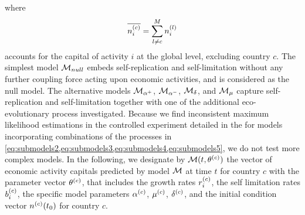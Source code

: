 where 
\begin{equation}
      \overline{n_i^{(c)} } = \sum_{l \neq c}^M n_{i}^{(l)}
\end{equation}
accounts for the capital of activity $i$ at the global level, excluding country $c$. 
% 
The simplest model $\mathcal{M}_{null}$ embeds self-replication and self-limitation without any further coupling force acting upon economic activities, and is considered as the null model.
% 
The alternative models $\mathcal{M}_{\alpha^+}$, $\mathcal{M}_{\alpha^-}$, $\mathcal{M}_\delta$, and $\mathcal{M}_\mu$ capture self-replication and self-limitation together with one of the additional eco-evolutionary process investigated.
% 
Because we find inconsistent maximum likelihood estimations in the controlled experiment detailed in the  for models incorporating combinations of the processes in \cref{eq:submodels2,eq:submodels3,eq:submodels4,eq:submodels5}, we do not test more complex models.
% 
In the following, we designate by $\mathcal{M}(t,\theta^{(c)} )$ the vector of economic activity capitals predicted by model $\mathcal{M}$ at time $t$ for country $c$ with the parameter vector $\theta^{(c)}$, that includes the growth rates $r_i^{(c)} $, the self limitation rates $b_i^{(c)}$, the specific model parameters $\alpha^{(c)}$, $\mu^{(c)}$, $\delta^{(c)}$, and the initial condition vector $n^{(c)} (t_0)$ for country $c$.



